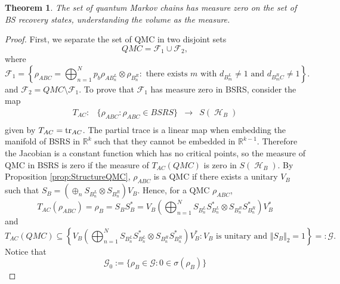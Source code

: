\documentclass[11pt]{article}
\theoremstyle{newdefinition}
\theoremstyle{newplain}
\newtheorem{theorem}[definition]{Theorem}
\theoremstyle{myplain}
\DeclareMathOperator{\HH}{\mathcal{H}}
\DeclareMathOperator{\1}{\mathds{1}}
\newcommand{\PCR}[1]{{\color{blue}#1}}
\begin{document}
\begin{theorem}\label{rem:measure}
    The set of quantum Markov chains has measure  zero on the  set of  BS recovery states, understanding the volume as the measure.
\end{theorem}
\begin{proof}
\PCR{First, we separate the set of QMC in two disjoint sets
\begin{equation}
    QMC=\mathcal{F}_1\cup \mathcal{F}_2,
\end{equation}
where
\begin{equation}
    \mathcal{F}_1=\left\{ \rho_{ABC} =\bigoplus_{n=1}^N p_b \rho_{AB_n^L}\otimes \rho_{B_n^R}: \text{  there exists } m \text{ with } d_{B_m^L}\neq 1 \text{ and } d_{B_m^RC}\neq 1\right\}.
\end{equation}
and $\mathcal{F}_2=QMC\setminus \mathcal{F}_1$. To prove that $\mathcal{F}_1$ }has measure zero in BSRS, consider the   map 
    \begin{equation}
    \begin{array}{cccc}
        T_{AC}:& \{\rho_{ABC}: \rho_{ABC} \in BSRS\} &\to &  S(\HH_B)\\
    \end{array}
    \end{equation}
    given by $T_{AC}=\tr_{AC}$. The partial trace is a linear map when embedding  the manifold of BSRS in  $\mathbb{R}^k$ such that they cannot be embedded in $\mathbb{R}^{k-1}$. Therefore the Jacobian is a constant function which has no critical points, so the measure of QMC in BSRS is zero if the measure of $T_{AC}(QMC)$ is zero in $S(\HH_B)$.  By Proposition \ref{prop:StructureQMC}, $\rho_{ABC}$ is a QMC if there exists a unitary $V_B$  such that $S_B=\left(\oplus_n S_{B_n^L}\otimes S_{B_n^R}\right)V_B$. Hence, for a QMC $\rho_{ABC}$,
    \begin{equation}
        T_{AC}(\rho_{ABC})=\rho_B=S_BS_B^*=V_B\left(\bigoplus_{n=1}^N S_{B_n^L}S_{B_n^L}^*\otimes S_{B_n^R}S_{B_n^R}^*\right)V_B^*
    \end{equation}
    and
    \begin{equation}
        T_{AC}(QMC)\subseteq \left\{V_B\left(\bigoplus_{n=1}^N S_{B_n^L}S_{B_n^L}^*\otimes S_{B_n^R}S_{B_n^R}^*\right)V_B^* : V_B \text{ is unitary and } \Vert S_B \Vert_2=1 \right\} =:\mathcal{G}.
    \end{equation}
   Notice that 
\begin{equation}
    \mathcal{G}_0:=\{ \rho_B \in \mathcal{G}: 0 \in \sigma(\rho_B)\}
\end{equation}

\end{proof}
\end{document}
